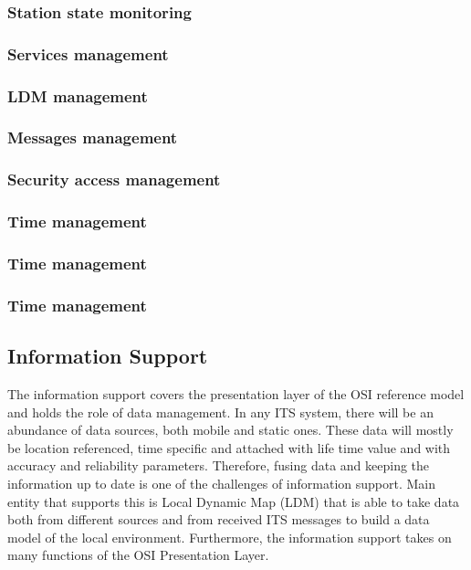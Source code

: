 \subsubsection{Station state monitoring}

\subsubsection{Services management }

\subsubsection{LDM management }

\subsubsection{Messages management}

\subsubsection{Security access management}
\subsubsection{Time management}
\subsubsection{Time management}
\subsubsection{Time management}

\subsection{Information Support}
The information support covers the presentation layer of the OSI reference model and holds the role of
data management. In any ITS system, there will be an abundance of data sources, both mobile and static
ones. These data will mostly be location referenced, time specific and attached with life time value and
with accuracy and reliability parameters. Therefore, fusing data and keeping the information up to date is
one of the challenges of information support. Main entity that supports this is Local Dynamic
Map (LDM) that is able to take data both from different sources and from received ITS messages to build
a data model of the local environment. Furthermore, the information support takes on many functions of
the OSI Presentation Layer. 
